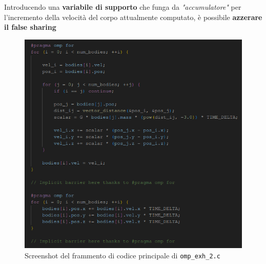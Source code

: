 \documentclass[12pt]{report}
\begin{document}
    Introducendo una \textbf{variabile di supporto} che funga da \textit{"accumulatore"} per l'incremento della velocità del corpo attualmente computato, è possibile \textbf{azzerare il false sharing}
    
    \begin{figure}[H]
        \centering
        \includegraphics[width=\textwidth]{images/omp_exh_2.png}
        \caption{Screenshot del frammento di codice principale di \texttt{omp\_exh\_2.c}}
        \label{fig:omp_exh_2}
    \end{figure}
    
\end{document}
